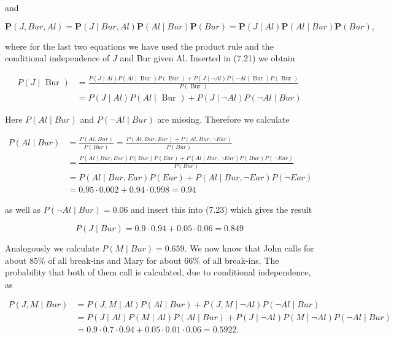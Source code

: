\documentclass[10pt]{book}
\begin{document}
and


\begin{equation*}
\boldsymbol{P}(J, B u r, A l)=\boldsymbol{P}(J \mid B u r, A l) \boldsymbol{P}(A l \mid B u r) \boldsymbol{P}(B u r)=\boldsymbol{P}(J \mid A l) \boldsymbol{P}(A l \mid B u r) \boldsymbol{P}(B u r), \tag{7.22}
\end{equation*}


where for the last two equations we have used the product rule and the conditional independence of $J$ and Bur given Al. Inserted in (7.21) we obtain


\begin{align*}
P(J \mid \text { Bur }) & =\frac{P(J \mid A l) P(A l \mid \text { Bur }) P(\text { Bur })+P(J \mid \neg A l) P(\neg A l \mid \text { Bur }) P(\text { Bur })}{P(\text { Bur })}  \tag{7.23}\\
& =P(J \mid A l) P(A l \mid \text { Bur })+P(J \mid \neg A l) P(\neg A l \mid B u r)
\end{align*}


Here $P(A l \mid B u r)$ and $P(\neg A l \mid B u r)$ are missing. Therefore we calculate

$$
\begin{aligned}
P(A l \mid B u r) & =\frac{P(A l, B u r)}{P(B u r)}=\frac{P(A l, B u r, E a r)+P(A l, B u r, \neg E a r)}{P(B u r)} \\
& =\frac{P(A l \mid B u r, E a r) P(B u r) P(E a r)+P(A l \mid B u r, \neg E a r) P(B u r) P(\neg E a r)}{P(B u r)} \\
& =P(A l \mid B u r, E a r) P(E a r)+P(A l \mid B u r, \neg E a r) P(\neg E a r) \\
& =0.95 \cdot 0.002+0.94 \cdot 0.998=0.94
\end{aligned}
$$

as well as $P(\neg A l \mid B u r)=0.06$ and insert this into (7.23) which gives the result

$$
P(J \mid B u r)=0.9 \cdot 0.94+0.05 \cdot 0.06=0.849
$$

Analogously we calculate $P(M \mid B u r)=0.659$. We now know that John calls for about $85 \%$ of all break-ins and Mary for about $66 \%$ of all break-ins. The probability that both of them call is calculated, due to conditional independence, as

$$
\begin{aligned}
P(J, M \mid B u r) & =P(J, M \mid A l) P(A l \mid B u r)+P(J, M \mid \neg A l) P(\neg A l \mid B u r) \\
& =P(J \mid A l) P(M \mid A l) P(A l \mid B u r)+P(J \mid \neg A l) P(M \mid \neg A l) P(\neg A l \mid B u r) \\
& =0.9 \cdot 0.7 \cdot 0.94+0.05 \cdot 0.01 \cdot 0.06=0.5922 .
\end{aligned}
$$
\end{document}
